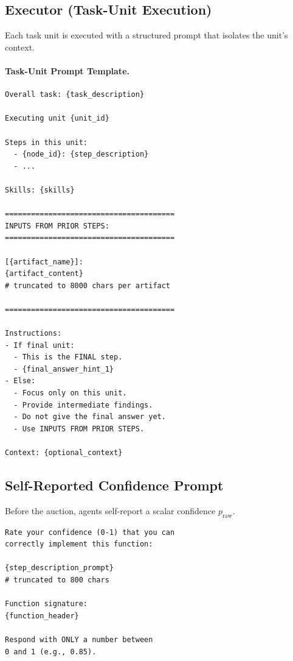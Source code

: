 \documentclass[11pt]{article}
\begin{document}
\subsection{Executor (Task-Unit Execution)}
Each task unit is executed with a structured prompt that isolates the unit's context.

\paragraph{Task-Unit Prompt Template.}
\begin{scriptsize}
\begin{verbatim}
Overall task: {task_description}

Executing unit {unit_id}

Steps in this unit:
  - {node_id}: {step_description}
  - ...

Skills: {skills}

=======================================
INPUTS FROM PRIOR STEPS:
=======================================

[{artifact_name}]:
{artifact_content} 
# truncated to 8000 chars per artifact

=======================================

Instructions:
- If final unit:
  - This is the FINAL step.
  - {final_answer_hint_1}
- Else:
  - Focus only on this unit.
  - Provide intermediate findings.
  - Do not give the final answer yet.
  - Use INPUTS FROM PRIOR STEPS.

Context: {optional_context}
\end{verbatim}
\end{scriptsize}

\subsection{Self-Reported Confidence Prompt}
Before the auction, agents self-report a scalar confidence $p_{\mathrm{raw}}$.

\begin{scriptsize}
\begin{verbatim}
Rate your confidence (0-1) that you can
correctly implement this function:

{step_description_prompt} 
# truncated to 800 chars

Function signature:
{function_header} 

Respond with ONLY a number between
0 and 1 (e.g., 0.85).
\end{verbatim}
\end{scriptsize}
\end{document}
